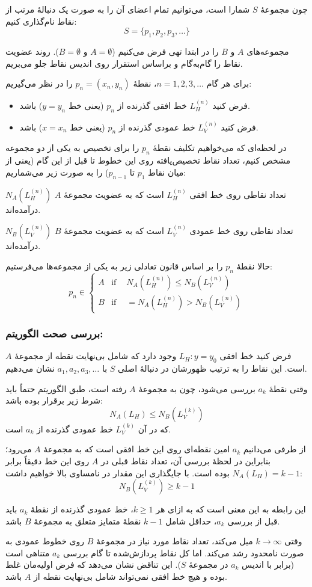 چون مجموعهٔ $S$ شمارا است، می‌توانیم تمام اعضای آن را به صورت یک دنبالهٔ مرتب از نقاط نام‌گذاری کنیم:
\[ S = \{p_1, p_2, p_3, \dots\} \]

مجموعه‌های $A$ و $B$ را در ابتدا تهی فرض می‌کنیم ($A = \emptyset$ و $B = \emptyset$). روند عضویت نقاط را گام‌به‌گام و براساس استقرار روی اندیس نقاط جلو می‌بریم.

برای هر گام $n = 1, 2, 3, \dots$، نقطهٔ $p_n = (x_n, y_n)$ را در نظر می‌گیریم:
\begin{itemize}
    \item فرض کنید $L_H^{(n)}$ خط افقی گذرنده از $p_n$ (یعنی خط $y = y_n$) باشد.
    \item فرض کنید $L_V^{(n)}$ خط عمودی گذرنده از $p_n$ (یعنی خط $x = x_n$) باشد.
\end{itemize}

در لحظه‌ای که می‌خواهیم تکلیف نقطهٔ $p_n$ را برای تخصیص به یکی از دو مجموعه مشخص کنیم، تعداد نقاط تخصیص‌یافته روی این خطوط تا قبل از این گام (یعنی از میان نقاط $p_1$ تا $p_{n-1}$) را به صورت زیر می‌شماریم:

$N_A(L_H^{(n)})$ تعداد نقاطی روی خط افقی $L_H^{(n)}$ است که به عضویت مجموعهٔ $A$ درآمده‌اند.

$N_B(L_V^{(n)})$ تعداد نقاطی روی خط عمودی $L_V^{(n)}$ است که به عضویت مجموعهٔ $B$ درآمده‌اند.



حالا نقطهٔ $p_n$ را بر اساس قانون تعادلی زیر به یکی از مجموعه‌ها می‌فرستیم:
\[
p_n \in 
\begin{cases} 
A & \text{if } \ \ \ \  N_A(L_H^{(n)}) \le N_B(L_V^{(n)}) \\ 
B & \text{if } \ \ \ \ =N_A(L_H^{(n)}) > N_B(L_V^{(n)}) 
\end{cases}
\]

\subsubsection*{بررسی صحت الگوریتم:}

 فرض کنید خط افقی $L_H: y = y_0$ وجود دارد که شامل {بی‌نهایت} نقطه از مجموعهٔ $A$ است. این نقاط را به ترتیب ظهورشان در دنبالهٔ اصلی $S$ با $a_1, a_2, a_3, \dots$ نشان می‌دهیم.

وقتی نقطهٔ $a_k$ بررسی می‌شود، چون به مجموعهٔ $A$ رفته است، طبق الگوریتم حتماً باید شرط زیر برقرار بوده باشد:
\[ N_A(L_H) \le N_B(L_V^{(k)}) \]
که در آن $L_V^{(k)}$ خط عمودی گذرنده از $a_k$ است.

از طرفی می‌دانیم $a_k$ امین نقطه‌ای روی این خط افقی است که به مجموعهٔ $A$ می‌رود؛ بنابراین در لحظهٔ بررسی آن، تعداد نقاط قبلی در $A$ روی این خط دقیقاً برابر $N_A(L_H) = k - 1$ بوده است. با جایگذاری این مقدار در نامساوی بالا خواهیم داشت:
\[ N_B(L_V^{(k)}) \ge k - 1 \]

این رابطه به این معنی است که به ازای هر $k \ge 1$، خط عمودی گذرنده از نقطهٔ $a_k$ باید قبل از بررسی $a_k$، حداقل شامل $k-1$ نقطهٔ متمایز متعلق به مجموعهٔ $B$ باشد.

وقتی $k \to \infty$ میل می‌کند، تعداد نقاط مورد نیاز در مجموعهٔ $B$ روی خطوط عمودی به صورت نامحدود رشد می‌کند. اما کل نقاط پردازش‌شده تا گام بررسی $a_k$ متناهی است (برابر با اندیس $a_k$ در مجموعهٔ $S$). این تناقض نشان می‌دهد که فرض اولیه‌مان غلط بوده و هیچ خط افقی نمی‌تواند شامل بی‌نهایت نقطه از $A$ باشد.

